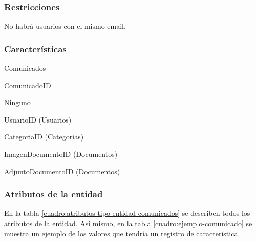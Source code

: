 \subsubsection*{Restricciones}
No habrá usuarios con el mismo email.

\subsubsection*{Características}
\begin{description}[nosep,style=multiline,labelindent=0.8cm,leftmargin=4.5cm,font=\normalfont]
    \item[Nombre] Comunicados
    \item[Id. principal] ComunicadoID
    \item[Id. alternativo] Ninguno
    \item[Atrib. heredados] 
        UsuarioID (Usuarios)

        CategoriaID (Categorias)

        ImagenDocumentoID (Documentos)

        AdjuntoDocumentoID (Documentos)
\end{description}

\subsubsection*{Atributos de la entidad}
En la tabla \ref{cuadro:atributos-tipo-entidad-comunicados} se describen todos los atributos de la entidad. Así mismo, en la tabla \ref{cuadro:ejemplo-comunicado} se muestra un ejemplo de los valores que tendría un registro de característica.

